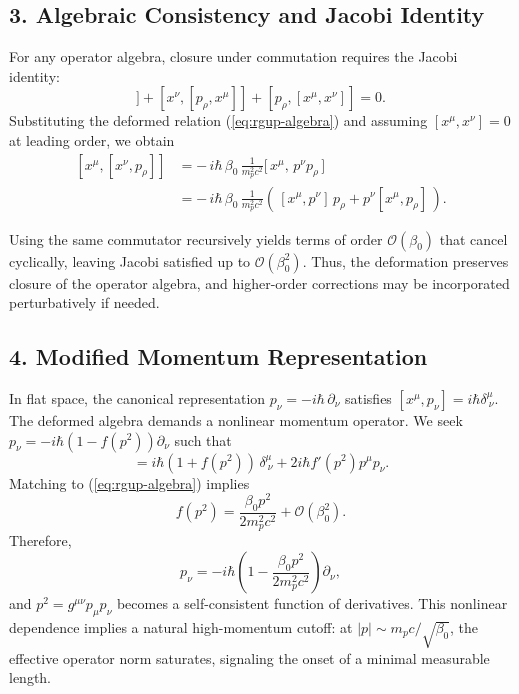\documentclass[11pt,oneside]{book}
\numberwithin{equation}{chapter}
\newcommand{\mpx}{m_p}               %
\newcommand{\betaz}{\beta_0}
\begin{document}
\subsection*{3. Algebraic Consistency and Jacobi Identity}

For any operator algebra, closure under commutation requires the Jacobi identity:
\begin{equation}
[x^\mu,[x^\nu,p_\rho]]+[x^\nu,[p_\rho,x^\mu]]+[p_\rho,[x^\mu,x^\nu]]=0.
\end{equation}
Substituting the deformed relation (\ref{eq:rgup-algebra}) and assuming
$[x^\mu,x^\nu]=0$ at leading order, we obtain
\begin{equation}
\begin{aligned}
[x^\mu,[x^\nu,p_\rho]]
&= -\,i\hbar\,\betaz\,\frac{1}{\mpx^2 c^2}
   \big[\,x^\mu,\,p^\nu p_\rho\,\big] \\[4pt]
&= -\,i\hbar\,\betaz\,\frac{1}{\mpx^2 c^2}
   \left(\,[x^\mu,p^\nu]\,p_\rho + p^\nu[x^\mu,p_\rho]\,\right).
\end{aligned}
\label{eq:jacobi_expand}
\end{equation}

Using the same commutator recursively yields terms of order $\mathcal{O}(\betaz)$
that cancel cyclically, leaving Jacobi satisfied up to
$\mathcal{O}(\betaz^2)$.  
Thus, the deformation preserves closure of the operator algebra, 
and higher-order corrections may be incorporated perturbatively if needed.
\clearpage
\subsection*{4. Modified Momentum Representation}

In flat space, the canonical representation $p_\nu = -i\hbar\,\partial_\nu$
satisfies $[x^\mu,p_\nu]=i\hbar\delta^\mu_{\ \nu}$.
The deformed algebra demands a nonlinear momentum operator.
We seek $p_\nu = -i\hbar(1-f(p^2))\partial_\nu$ such that
\begin{equation}
[x^\mu,p_\nu] = i\hbar(1 + f(p^2))\,\delta^\mu_{\ \nu}
+ 2i\hbar f'(p^2)p^\mu p_\nu.
\end{equation}
Matching to (\ref{eq:rgup-algebra}) implies
\begin{equation}
f(p^2)=\frac{\betaz p^2}{2\mpx^2 c^2} + \mathcal{O}(\betaz^2).
\end{equation}
Therefore,
\begin{equation}
p_\nu = -i\hbar\left(1 - \frac{\betaz p^2}{2\mpx^2 c^2}\right)\partial_\nu,
\end{equation}
and $p^2 = g^{\mu\nu}p_\mu p_\nu$ becomes a self-consistent function of derivatives.
This nonlinear dependence implies a natural high-momentum cutoff:
at $|p|\sim\mpx c/\sqrt{\betaz}$, the effective operator norm saturates, signaling
the onset of a minimal measurable length.
\end{document}
